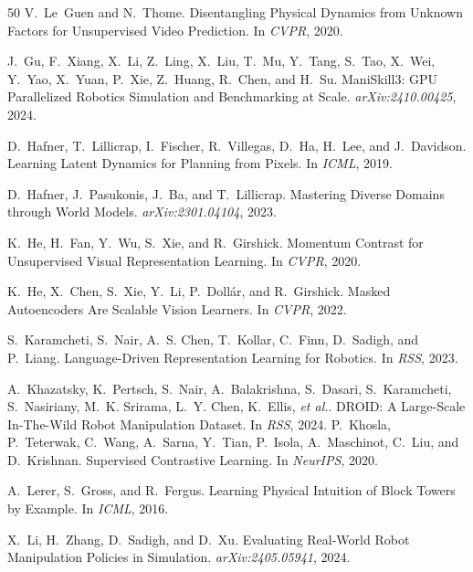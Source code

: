 \documentclass{article}
\newcommand{\etal}{\textit{et al.}}
\begin{document}
{\begin{thebibliography}{50}
V.~Le~Guen and N.~Thome.
\newblock Disentangling Physical Dynamics from Unknown Factors for Unsupervised Video Prediction.
\newblock In \emph{CVPR}, 2020.

J.~Gu, F.~Xiang, X.~Li, Z.~Ling, X.~Liu, T.~Mu, Y.~Tang, S.~Tao, X.~Wei, Y.~Yao, X.~Yuan, P.~Xie, Z.~Huang, R.~Chen, and H.~Su.
\newblock ManiSkill3: GPU Parallelized Robotics Simulation and Benchmarking at Scale.
\newblock \emph{arXiv:2410.00425}, 2024.

D.~Hafner, T.~Lillicrap, I.~Fischer, R.~Villegas, D.~Ha, H.~Lee, and J.~Davidson.
\newblock Learning Latent Dynamics for Planning from Pixels.
\newblock In \emph{ICML}, 2019.

D.~Hafner, J.~Pasukonis, J.~Ba, and T.~Lillicrap.
\newblock Mastering Diverse Domains through World Models.
\newblock \emph{arXiv:2301.04104}, 2023.

K.~He, H.~Fan, Y.~Wu, S.~Xie, and R.~Girshick.
\newblock Momentum Contrast for Unsupervised Visual Representation Learning.
\newblock In \emph{CVPR}, 2020.

K.~He, X.~Chen, S.~Xie, Y.~Li, P.~Doll{\'a}r, and R.~Girshick.
\newblock Masked Autoencoders Are Scalable Vision Learners.
\newblock In \emph{CVPR}, 2022.

S.~Karamcheti, S.~Nair, A.~S. Chen, T.~Kollar, C.~Finn, D.~Sadigh, and P.~Liang.
\newblock Language-Driven Representation Learning for Robotics.
\newblock In \emph{RSS}, 2023.


A.~Khazatsky, K.~Pertsch, S.~Nair, A.~Balakrishna, S.~Dasari, S.~Karamcheti, S.~Nasiriany, M.~K. Srirama, L.~Y. Chen, K.~Ellis, \etal.
\newblock DROID: A Large-Scale In-The-Wild Robot Manipulation Dataset.
\newblock In \emph{RSS}, 2024.
P.~Khosla, P.~Teterwak, C.~Wang, A.~Sarna, Y.~Tian, P.~Isola, A.~Maschinot, C.~Liu, and D.~Krishnan.
\newblock Supervised Contrastive Learning.
\newblock In \emph{NeurIPS}, 2020.

A.~Lerer, S.~Gross, and R.~Fergus.
\newblock Learning Physical Intuition of Block Towers by Example.
\newblock In \emph{ICML}, 2016.

X.~Li, H.~Zhang, D.~Sadigh, and D.~Xu.
\newblock Evaluating Real-World Robot Manipulation Policies in Simulation.
\newblock \emph{arXiv:2405.05941}, 2024.


\end{thebibliography}}
\end{document}

